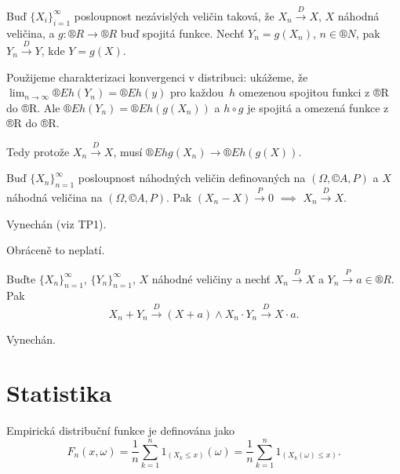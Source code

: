 \documentclass[12pt]{article}					%
\begin{document}
\begin{lemma}
	Buď $\{X_i\}_{i=1}^∞$ posloupnost nezávislých veličin taková, že $X_n \overset{D} \rightarrow X$, $X$ náhodná veličina, a $g: ®R \rightarrow ®R$ buď spojitá funkce. Nechť $Y_n = g(X_n)$, $n \in ®N$, pak $Y_n \overset{D} \rightarrow Y$, kde $Y = g(X)$.

	\begin{dukazin}
		Použijeme charakterizaci konvergenci v distribuci: ukážeme, že $\lim_{n \rightarrow ∞} ®E h(Y_n) = ®E h(y)$ pro každou $h$ omezenou spojitou funkci z ®R do ®R. Ale $®E h(Y_n) = ®E h(g(X_n))$ a $h \circ g$ je spojitá a omezená funkce z ®R do ®R.

		Tedy protože $X_n \overset{D} \rightarrow X$, musí $®E hg(X_n) \rightarrow ®E h(g(X))$.
	\end{dukazin}

	\begin{veta}
		Buď $\{X_n\}_{n=1}^∞$ posloupnost náhodných veličin definovaných na $(\Omega, ©A, P)$ a $X$ náhodná veličina na $(\Omega, ©A, P)$. Pak $(X_n - X) \overset{P} \rightarrow 0$ $\implies$ $X_n \overset{D} \rightarrow X$.

		\begin{dukazin}
			Vynechán (viz TP1).
		\end{dukazin}

		\begin{upozorneni}
			Obráceně to neplatí.
		\end{upozorneni}
	\end{veta}

	\begin{veta}
		Buďte $\{X_n\}_{n=1}^∞$, $\{Y_n\}_{n=1}^∞$, $X$ náhodné veličiny a nechť $X_n \overset{D} \rightarrow X$ a $Y_n \overset{P} \rightarrow a \in ®R$. Pak
		$$ X_n + Y_n \overset{D} \rightarrow (X + a) \land X_n·Y_n \overset{D} \rightarrow X·a. $$

		\begin{dukazin}
			Vynechán.
		\end{dukazin}
	\end{veta}
\end{lemma}


\part{Statistika}
\begin{definice}
	Empirická distribuční funkce je definována jako
	$$ F_n(x, \omega) = \frac{1}{n} \sum_{k=1}^n 1_{(X_k ≤ x)}(\omega) = \frac{1}{n} \sum_{k=1}^n 1_{(X_k(\omega) ≤ x)}. $$
\end{definice}
\end{document}
